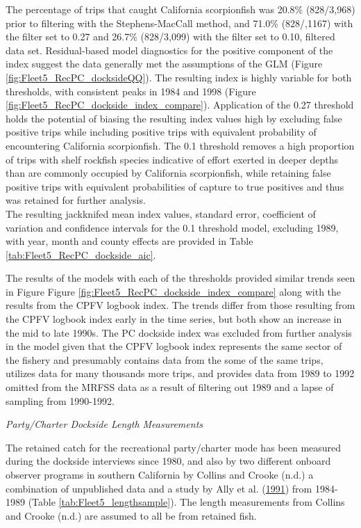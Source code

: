 \documentclass[12pt,]{article}
\begin{document}
The percentage of trips that caught California scorpionfish was 20.8\%
(828/3,968) prior to filtering with the Stephens-MacCall method, and
71.0\% (828/,1167) with the filter set to 0.27 and 26.7\% (828/3,099)
with the filter set to 0.10, filtered data set. Residual-based model
diagnostics for the positive component of the index suggest the data
generally met the assumptions of the GLM (Figure
\ref{fig:Fleet5_RecPC_docksideQQ}). The resulting index is highly
variable for both thresholds, with consistent peaks in 1984 and 1998
(Figure \ref{fig:Fleet5_RecPC_dockside_index_compare}). Application of
the 0.27 threshold holds the potential of biasing the resulting index
values high by excluding false positive trips while including positive
trips with equivalent probability of encountering California
scorpionfish. The 0.1 threshold removes a high proportion of trips with
shelf rockfish species indicative of effort exerted in deeper depths
than are commonly occupied by California scorpionfish, while retaining
false positive trips with equivalent probabilities of capture to true
positives and thus was retained for further analysis.\\
The resulting jackknifed mean index values, standard error, coefficient
of variation and confidence intervals for the 0.1 threshold model,
excluding 1989, with year, month and county effects are provided in
Table \ref{tab:Fleet5_RecPC_dockside_aic}.

The results of the models with each of the thresholds provided similar
trends seen in Figure Figure
\ref{fig:Fleet5_RecPC_dockside_index_compare} along with the results
from the CPFV logbook index. The trends differ from those resulting from
the CPFV logbook index early in the time series, but both show an
increase in the mid to late 1990s. The PC dockside index was excluded
from further analysis in the model given that the CPFV logbook index
represents the same sector of the fishery and presumably contains data
from the some of the same trips, utilizes data for many thousands more
trips, and provides data from 1989 to 1992 omitted from the MRFSS data
as a result of filtering out 1989 and a lapse of sampling from
1990-1992.

\emph{Party/Charter Dockside Length Measurements}

The retained catch for the recreational party/charter mode has been
measured during the dockside interviews since 1980, and also by two
different onboard observer programs in southern California by Collins
and Crooke (n.d.) a combination of unpublished data and a study by Ally
et al. (\protect\hyperlink{ref-Ally1991}{1991}) from 1984-1989 (Table
\ref{tab:Fleet5_lengthsample}). The length measurements from Collins and
Crooke (n.d.) are assumed to all be from retained fish.
\end{document}
